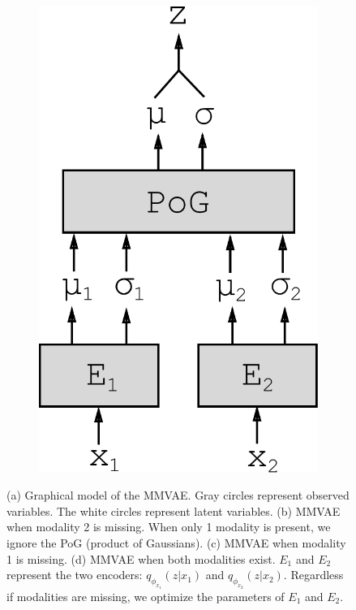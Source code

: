 \documentclass{article}
\begin{document}
\begin{figure}[!h]
\begin{subfigure}[b]{.15\linewidth}
        \includegraphics[width=.75\linewidth]{modelv3}
        \caption{}
        \label{fig:diagram:modelv3}
    \end{subfigure}
    \caption{(a) Graphical model of the MMVAE. Gray circles represent observed variables. The white circles represent latent variables. (b) MMVAE when modality 2 is missing. When only 1 modality is present, we ignore the PoG (product of Gaussians). (c) MMVAE when modality 1 is missing. (d) MMVAE when both modalities exist. $E_{1}$ and $E_{2}$ represent the two encoders: $q_{\phi_{x_{1}}}(z | x_{1})$ and $q_{\phi_{x_{2}}}(z | x_{2})$. Regardless if modalities are missing, we optimize the parameters of $E_{1}$ and $E_{2}$.}
    \label{fig:diagram}
\end{figure}


{\small
\linespread{1}

}
\end{document}

